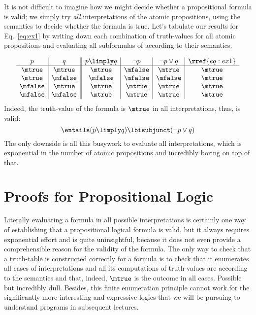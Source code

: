 \documentclass[11pt,twoside]{scrartcl}
\begin{document}
It is not difficult to imagine how we might decide whether a propositional formula is valid; we simply try \emph{all} interpretations of the atomic propositions, using the semantics to decide whether the formula is true. 
Let's tabulate our results for Eq.~\ref{eq:ex1} by writing down each combination of truth-values for all atomic propositions and evaluating all subformulas of  according to their semantics.

\[\begin{array}{c|c||c|c|c|c}
p & q & p \limply q & \lnot p & \lnot p \lor q & \rref{eq:ex1}
    \\\hline
    \mtrue & \mtrue & \mtrue & \mfalse & \mtrue & \mtrue \\
    \mtrue & \mfalse & \mfalse & \mfalse & \mfalse & \mtrue \\
    \mfalse & \mtrue & \mtrue & \mtrue & \mtrue & \mtrue \\
    \mfalse & \mfalse & \mtrue & \mtrue & \mtrue & \mtrue
\end{array}\]
Indeed, the truth-value of the formula  is $\mtrue$ in all interpretations, thus,  is valid:
\[
\entails (p \limply q) \lbisubjunct (\lnot p \lor q)
\]
The only downside is all this busywork to evaluate all interpretations, which is exponential in the number of atomic propositions and incredibly boring on top of that.


\section{Proofs for Propositional Logic}

Literally evaluating a formula in all possible interpretations is certainly one way of establishing that a propositional logical formula is valid, but it always requires exponential effort and is quite uninsightful, because it does not even provide a comprehensible reason for the validity of the formula.
The only way to check that a truth-table is constructed correctly for a formula is to check that it enumerates all cases of interpretations and all its computations of truth-values are according to the semantics and that, indeed, $\mtrue$ is the outcome in all cases.
Possible but incredibly dull.
Besides, this finite enumeration principle cannot work for the significantly more interesting and expressive logics that we will be pursuing to understand programs in subsequent lectures.
\end{document}

